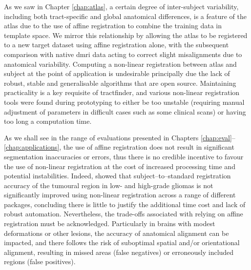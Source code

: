 \documentclass[12pt,phd,a4paper,twoside]{ucl_thesis}
\renewcommand{\textcite}[2][]{
\ifthenelse { \equal {#1} {} }  {\citeauthor{#2}\autocite{#2}}   {\citeauthor{#1}\autocite{#2}}}
\begin{document}
As we saw in Chapter \ref{chap:atlas}, a certain degree of inter-subject variability, including both tract-specific and global anatomical differences, is a feature of the atlas due to the use of affine registration to combine the training data in template space.
We mirror this relationship by allowing the atlas to be registered to a new target dataset using affine registration alone, with the subsequent comparison with native \gls{dmri} data acting to correct slight misalignments due to anatomical variability.
Computing a non-linear registration between atlas and subject at the point of application is undesirable principally due the lack of robust, stable and generalisable algorithms that are open source.
Maintaining practicality is a key requisite of tractfinder, and various non-linear registration tools were found during prototyping to either be too unstable (requiring manual adjustment of parameters in difficult cases such as some clinical scans) or having too long a computation time\autocite{Visser2020}.

As we shall see in the range of evaluations presented in Chapters \ref{chap:eval}--\ref{chap:applications}, the use of affine registration does not result in significant segmentation inaccuracies or errors, thus there is no credible incentive to favour the use of non-linear registration at the cost of increased processing time and potential instabilities.
Indeed, \textcite{Visser2020} showed that subject--to--standard registration accuracy of the tumoural region in low- and high-grade gliomas is not significantly improved using non-linear registration across a range of different packages, concluding there is little to justify the additional time cost and lack of robust automation.
Nevertheless, the trade-offs associated with relying on affine registration must be acknowledged.
Particularly in brains with modest deformations or other lesions, the accuracy of anatomical alignment can be impacted, and there follows the risk of suboptimal spatial and/or orientational alignment, resulting in missed areas (false negatives) or erroneously included regions (false positives).
\end{document}
